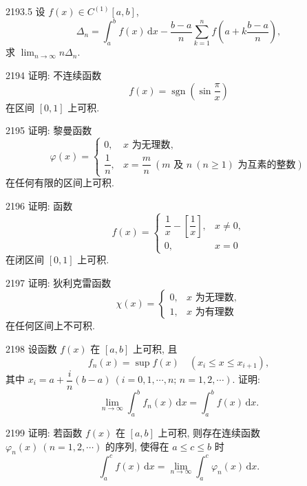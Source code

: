 \begin{prob}[M]{2193.5}
设 $f(x) \in C^{(1)}[a, b]$,
\[
\Delta_n = \int_{a}^{b} f(x)\,\mathrm{d}x - \frac{b - a}{n} \sum_{k=1}^{n} f\left(a + k\frac{b - a}{n}\right),
\]
求 $\displaystyle\lim_{n \to \infty} n\Delta_n$.
\end{prob}

\begin{prob}[M]{2194}
证明: 不连续函数
\[
f(x) = \operatorname{sgn}\left(\sin\frac{\pi}{x}\right)
\]
在区间 $[0, 1]$ 上可积.
\end{prob}

\begin{prob}[M]{2195}
证明: 黎曼函数
\[
\varphi(x) = \begin{cases} 0, & x \text{ 为无理数}, \\ \dfrac{1}{n}, & x = \dfrac{m}{n} \ (m \text{ 及 } n \ (n \geqslant 1) \text{ 为互素的整数}) \end{cases}
\]
在任何有限的区间上可积.
\end{prob}

\begin{prob}[M]{2196}
证明: 函数
\[
f(x) = \begin{cases} \dfrac{1}{x} - \left[\dfrac{1}{x}\right], & x \neq 0, \\ 0, & x = 0 \end{cases}
\]
在闭区间 $[0, 1]$ 上可积.
\end{prob}

\begin{prob}[M]{2197}
证明: 狄利克雷函数
\[
\chi(x) = \begin{cases} 0, & x \text{ 为无理数}, \\ 1, & x \text{ 为有理数} \end{cases}
\]
在任何区间上不可积.
\end{prob}

\begin{prob}[M]{2198}
设函数 $f(x)$ 在 $[a, b]$ 上可积, 且
\[
f_n(x) = \sup f(x) \quad (x_i \leqslant x \leqslant x_{i+1}),
\]
其中 $x_i = a + \dfrac{i}{n}(b - a) \ (i = 0, 1, \cdots, n; \, n = 1, 2, \cdots)$. 证明:
\[
\lim_{n \to \infty} \int_{a}^{b} f_n(x)\,\mathrm{d}x = \int_{a}^{b} f(x)\,\mathrm{d}x.
\]
\end{prob}

\begin{prob}[M]{2199}
证明: 若函数 $f(x)$ 在 $[a, b]$ 上可积, 则存在连续函数 $\varphi_n(x) \ (n = 1, 2, \cdots)$ 的序列, 使得在 $a \leqslant c \leqslant b$ 时
\[
\int_{a}^{c} f(x)\,\mathrm{d}x = \lim_{n \to \infty} \int_{a}^{c} \varphi_n(x)\,\mathrm{d}x.
\]
\end{prob}

